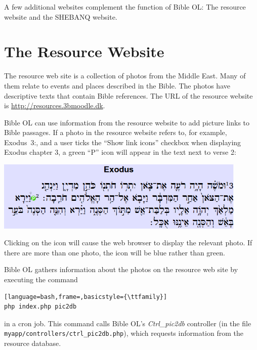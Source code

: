 \documentclass[11pt,oneside,a4paper]{memoir}
\newcommand*{\bibleref}[3]{#1~#2\thinspace:\thinspace#3}
\begin{document}
A few additional websites complement the function of Bible OL: The resource website and the SHEBANQ
website.



\section{The Resource Website}\label{sec-resource-web}

The resource web site is a collection of photos from the Middle East. Many of them relate to events
and places described in the Bible. The photos have descriptive texts that contain Bible references.
The URL of the resource website is \url{http://resources.3bmoodle.dk}.

Bible OL can use information from the resource website to add picture links to Bible passages. If a
photo in the resource website refers to, for example, \bibleref{Exodus}{3}{2}, and a user ticks the
``Show link icons'' checkbox when displaying Exodus chapter 3, a green ``P'' icon will appear in the
text next to verse 2:

\begin{center}
\includegraphics[width=0.9\textwidth]{exodus3.png}
\end{center}

Clicking on the icon will cause the web browser to display the relevant photo. If there are more
than one photo, the icon will be blue rather than green.

Bible OL gathers information about the photos on the resource web site by executing the command

\begin{lstlisting}[language=bash,frame=,basicstyle={\ttfamily}]
php index.php pic2db
\end{lstlisting}

\noindent
in a cron job. This command calls Bible OL's \emph{Ctrl\_pic2db} controller (in the file
\texttt{myapp/\allowbreak{}controllers/\allowbreak{}ctrl\_pic2db.php}), which requests information from the resource database.
\end{document}
